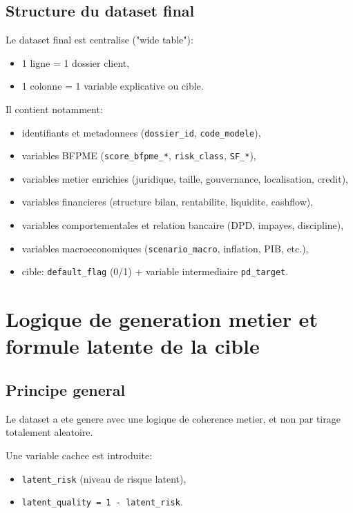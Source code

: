 \documentclass[11pt,a4paper]{article}
\begin{document}
\subsection{Structure du dataset final}

Le dataset final est centralise ("wide table"):
\begin{itemize}[leftmargin=1.2cm]
  \item 1 ligne = 1 dossier client,
  \item 1 colonne = 1 variable explicative ou cible.
\end{itemize}

Il contient notamment:
\begin{itemize}[leftmargin=1.2cm]
  \item identifiants et metadonnees (\texttt{dossier\_id}, \texttt{code\_modele}),
  \item variables BFPME (\texttt{score\_bfpme\_*}, \texttt{risk\_class}, \texttt{SF\_*}),
  \item variables metier enrichies (juridique, taille, gouvernance, localisation, credit),
  \item variables financieres (structure bilan, rentabilite, liquidite, cashflow),
  \item variables comportementales et relation bancaire (DPD, impayes, discipline),
  \item variables macroeconomiques (\texttt{scenario\_macro}, inflation, PIB, etc.),
  \item cible: \texttt{default\_flag} (0/1) + variable intermediaire \texttt{pd\_target}.
\end{itemize}

\section{Logique de generation metier et formule latente de la cible}

\subsection{Principe general}

Le dataset a ete genere avec une logique de coherence metier, et non par tirage totalement aleatoire.

Une variable cachee est introduite:
\begin{itemize}[leftmargin=1.2cm]
  \item \texttt{latent\_risk} (niveau de risque latent),
  \item \texttt{latent\_quality = 1 - latent\_risk}.
\end{itemize}
\end{document}
